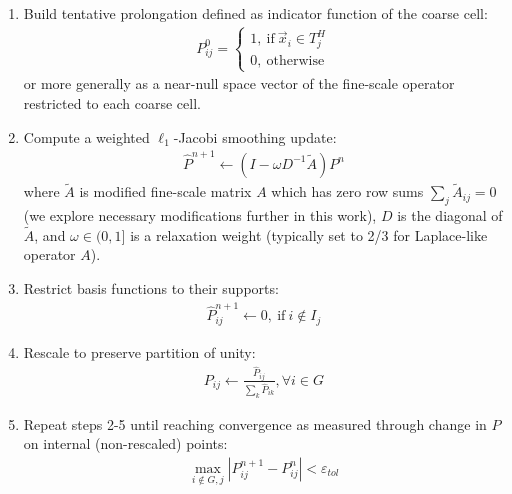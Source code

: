 \begin{enumerate}
    \item Build tentative prolongation defined as indicator function of the coarse cell:
    \begin{align}
        P^0_{ij} =
        \begin{cases}
        1, \:\text{if}\:\vec{x}_i \in T_j^H \\
        0, \:\text{otherwise}
        \end{cases}
    \end{align}
    or more generally as a near-null space vector of the fine-scale operator restricted to each coarse cell.
    \item Compute a weighted $\ell_1$-Jacobi smoothing update:
    \begin{align}
        \widehat{P}^{n+1} \leftarrow (I - \omega D^{-1} \widetilde{A}) P^n \label{eq:msrsb_update}
    \end{align}
    where $\widetilde{A}$ is modified fine-scale matrix $A$ which has zero row sums $\sum_j \widetilde{A}_{ij} = 0$ (we explore necessary modifications further in this work), $D$ is the diagonal of $\widetilde{A}$, and $\omega \in (0,1]$ is a relaxation weight (typically set to 2/3 for Laplace-like operator $A$).  
    \item Restrict basis functions to their supports:
    \begin{align}
        \widehat{P}^{n+1}_{ij} \leftarrow 0, \:\text{if}\: i \notin I_j \label{eq:msrsb_restrict}
    \end{align}
    \item Rescale to preserve partition of unity:
    \begin{align}
        P_{ij} \leftarrow \frac{\widehat{P}_{ij}}{\sum\limits_{k}\widehat{P}_{ik}}, \forall i \in G \label{eq:msrsb_rescale}
    \end{align}
    \item Repeat steps 2-5 until reaching convergence as measured through change in $P$ on internal (non-rescaled) points:
    \begin{align}
        \max\limits_{i \notin G, j}|P^{n+1}_{ij} - P^{n}_{ij}| < \varepsilon_{tol} \label{eq:msrsb_check}
    \end{align}
\end{enumerate}

